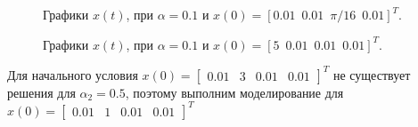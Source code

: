 \begin{figure}[!h]
\caption{Графики $x(t)$, при $\alpha = 0.1$ и $x(0) = [0.01\, \, \,  0.01\, \, \, \pi /16\, \, \, 0.01]^T$.}
\label{4_3_0.1_3}
\end{figure}


\begin{figure}[!h]
\caption{Графики $x(t)$, при $\alpha = 0.1$ и $x(0) = [5\, \, \,  0.01\, \, \, 0.01\, \, \, 0.01]^T$.}
\label{4_3_0.1_4}
\end{figure}

\newpage
Для начального условия $x(0)=\begin{bmatrix}
          0.01 & 3 & 0.01 & 0.01
      \end{bmatrix}^T$ не существует решения для $\alpha_2 = 0.5$, поэтому выполним моделирование для $x(0)=\begin{bmatrix}
          0.01 & 1 & 0.01 & 0.01
      \end{bmatrix}^T$


